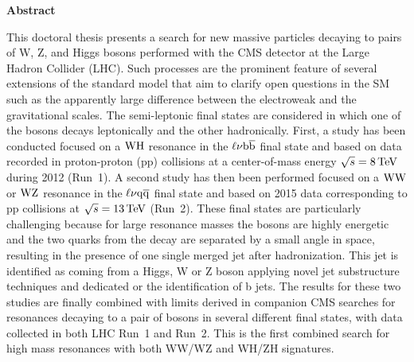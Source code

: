 \vspace*{\fill}

\begin{center}
\Large
\textbf{Abstract}
\end{center}

\noindent This doctoral thesis presents a search for new massive particles decaying to pairs of W, Z, and Higgs bosons performed with the CMS detector at the Large Hadron Collider (LHC).
Such processes are the prominent feature of several extensions of the standard model that aim to clarify open questions in the SM such as the apparently large difference between the electroweak and the gravitational scales. 
The semi-leptonic final states are considered in which one of the bosons decays leptonically and the other hadronically. 
First, a study has been conducted focused on a $\mathrm{W}\mathrm{H}$ resonance in the $\ell\nu{\mathrm{b}\overline{\mathrm{b}}}$ final state and based on data recorded in proton-proton (pp) collisions at a center-of-mass energy $\sqrt{s} = 8\,\text{Te\hspace{-.08em}V}$ during 2012 (Run~1).
A second study has then been performed focused on a $\mathrm{W}\mathrm{W}$ or $\mathrm{W}\mathrm{Z}$ resonance in the $\ell\nu\mathrm{q}\overline{\mathrm{q}}$ final state and based on 2015 data corresponding to pp collisions at $\sqrt{s} = 13\,\text{Te\hspace{-.08em}V}$ (Run~2).
These final states are particularly challenging because for large resonance masses the bosons are highly energetic and the two quarks from the decay are separated by a small angle in space, resulting in the presence of one single merged jet after hadronization. This jet is identified as coming from a Higgs, W or Z boson applying novel jet substructure techniques and dedicated or the identification of b jets.
The results for these two studies are finally combined with limits derived in companion CMS searches for resonances decaying to a pair of bosons in several different final states, with data collected in both LHC Run~1 and Run~2.
This is the first combined search for high mass resonances with both WW/WZ and WH/ZH signatures.\\

